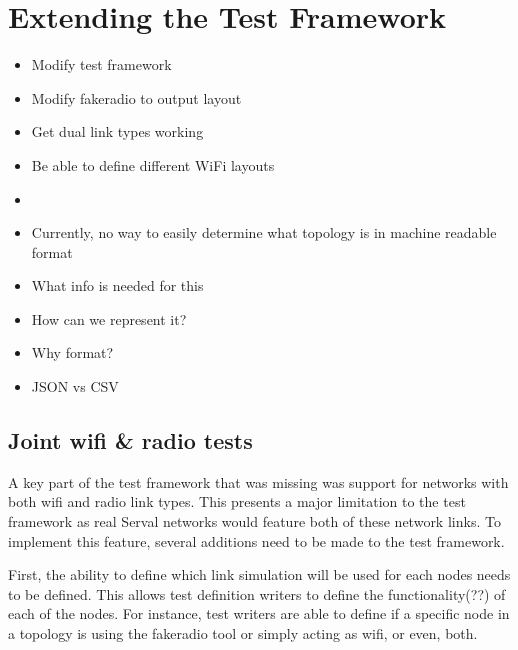 
\chapter{Extending the Test Framework} %
\label{Chapter4}


\begin{itemize}
    \item Modify test framework
    \item Modify fakeradio to output layout
    \item Get dual link types working
    \item Be able to define different WiFi layouts
    \item 
\end{itemize}


\begin{itemize}
    \item Currently, no way to easily determine what topology is in machine readable format
    \item What info is needed for this 
    \item How can we represent it?
    \item Why format?
    \item JSON vs CSV
\end{itemize}


\section{Joint wifi \& radio tests}
A key part of the test framework that was missing was support for networks with both wifi and radio link types. 
This presents a major limitation  to the test framework as real Serval networks would feature both of these network links.
To implement this feature, several additions need to be made to the test framework.

First, the ability to define which link simulation will be used for each nodes needs to be defined.
This allows test definition writers to define the functionality(??) of each of the nodes. 
For instance, test writers are able to define if a specific node in a topology is using the fakeradio tool or simply acting as wifi, or even, both. 

